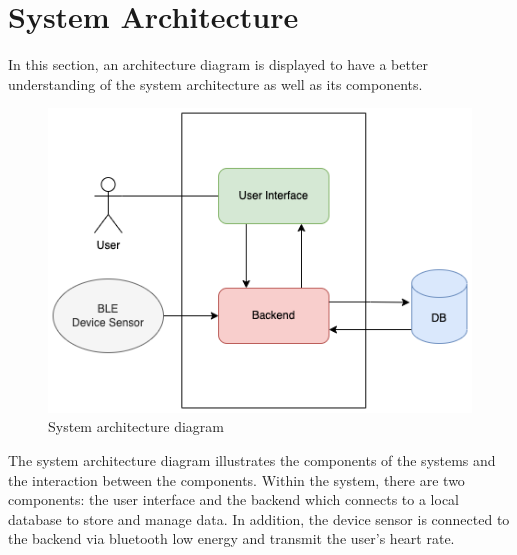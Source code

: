 \section{System Architecture}
In this section, an architecture diagram is displayed to have a better understanding of the system architecture as well as its components.
\begin{figure}[H]
    \centering
    \includegraphics[width=1\textwidth]{diagrams/system-diagram.drawio.png}
    \caption{System architecture diagram}
    \label{fig:sys_diagram}
\end{figure}
The system architecture diagram illustrates the components of the systems and the interaction between the components. Within the system, there are two components: the user interface and the backend which connects to a local database to store and manage data.
In addition, the device sensor is connected to the backend via bluetooth low energy and transmit the user's heart rate.